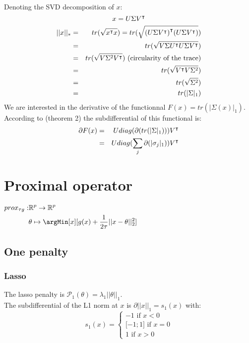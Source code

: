 \documentclass{article}
\begin{document}
Denoting the SVD decomposition of $ x $:
\[ x = U\Sigma{V}^\intercal \]
\begin{eqnarray}
 ||x||_* &=& tr(\sqrt{{x}^\intercal x}) = tr(\sqrt{{(U\Sigma{V}^\intercal)}^\intercal(U\Sigma{V}^\intercal)})  \notag \\
 &=&tr(\sqrt{V\Sigma{U}^\intercal U\Sigma{V}^\intercal}) \notag \\
 &=&tr(\sqrt{V\Sigma^2{V}^\intercal}) \text{ (circularity of the trace)} \notag \\  
 &=&tr(\sqrt{{V}^\intercal V\Sigma^2}) \notag \\  
 &=&tr(\sqrt{\Sigma^2}) \notag \\  
 &=&tr(|\Sigma|_1) \notag
\end{eqnarray}
We are interested in the derivative of the functionnal \(F(x) = tr(|\Sigma(x)|_1) \). 
According to \cite{Watson1992} (theorem 2) the subdifferential of this functional is:
\begin{eqnarray*}
\partial F(x) &=& U diag(\partial(tr(|\Sigma|_1))) {V}^\intercal \\
&=& U diag(\sum_j \partial(|\sigma_j|_1)) {V}^\intercal \\
\end{eqnarray*}

\clearpage

\section{Proximal operator}
\label{sec:orgfbb51e0}
$
\begin{aligned}[t]
 prox_{\tau g} :& \Real^p \rightarrow \Real^p \\
                & \theta \mapsto \argMin[x][g(x)+\frac{1}{2 \tau} ||x-\theta||_2^2]  
\end{aligned}
$
\subsection{One penalty}
\label{sec:orgc1a56ca}
\subsubsection{Lasso}
\label{sec:org1b9b5bf}

The lasso penalty is $\mathcal{P}_1(\theta)=\lambda_1||\theta||_1$. \\
The subdifferential of the L1 norm at \(x\) is \(\partial ||x||_1 = s_1(x) \) with:
\[ s_1(x) = \left\{ \begin{array}{l} -1 \text{ if } x < 0 \\
                            {[}-1;1{]} \text{ if } x = 0 \\
                            1  \text{ if } x > 0 
                \end{array} \right. \]
\end{document}
